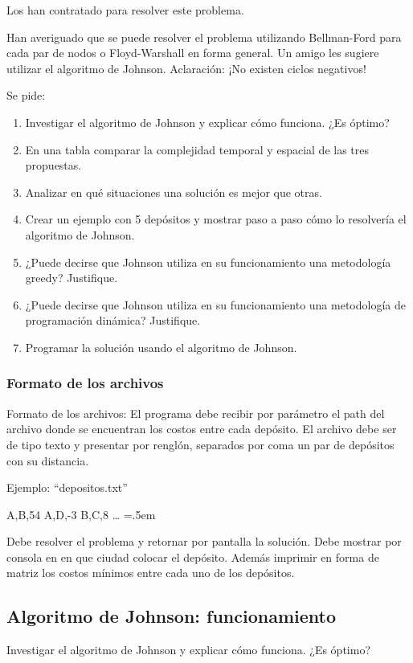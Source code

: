 \documentclass[titlepage,a4paper]{article}
\newenvironment{lcverbatim}
 {\SaveVerbatim{cverb}}
 {\endSaveVerbatim
  \flushleft\fboxrule=0pt\fboxsep=.5em
  \colorbox{cverbbg}{%
    \makebox[\dimexpr\linewidth-2\fboxsep][l]{\BUseVerbatim{cverb}}%
  }
  \endflushleft
}
\begin{document}
Los han contratado para resolver este problema.

Han averiguado que se puede resolver el problema utilizando Bellman-Ford para cada
par de nodos o Floyd-Warshall en forma general. Un amigo les sugiere utilizar el
algoritmo de Johnson. Aclaración: ¡No existen ciclos negativos!

\noindent Se pide:

\begin{enumerate}
    \item Investigar el algoritmo de Johnson y explicar cómo funciona. ¿Es óptimo?
    \item En una tabla comparar la complejidad temporal y espacial de las tres propuestas.
    \item Analizar en qué situaciones una solución es mejor que otras.
    \item Crear un ejemplo con 5 depósitos y mostrar paso a paso cómo lo resolvería el algoritmo de Johnson.
    \item ¿Puede decirse que Johnson utiliza en su funcionamiento una metodología greedy? Justifique.
    \item ¿Puede decirse que Johnson utiliza en su funcionamiento una metodología de programación dinámica? Justifique.
    \item Programar la solución usando el algoritmo de Johnson.
\end{enumerate}

\subsubsection{Formato de los archivos}
Formato de los archivos:
El programa debe recibir por parámetro el path del archivo donde se encuentran los
costos entre cada depósito. El archivo debe ser de tipo texto y presentar por renglón,
separados por coma un par de depósitos con su distancia.

Ejemplo: “depositos.txt”

\begin{lcverbatim}
    A,B,54
    A,D,-3
    B,C,8
    …
\end{lcverbatim}

Debe resolver el problema y retornar por pantalla la solución. Debe mostrar por
consola en en que ciudad colocar el depósito. Además imprimir en forma de matriz los
costos mínimos entre cada uno de los depósitos.


\newpage\subsection{Algoritmo de Johnson: funcionamiento}\label{sec:parte1_1}
\begin{tcolorbox}[colback=blue!5!white,colframe=blue!75!black,title=Enunciado 1.1]
    Investigar el algoritmo de Johnson y explicar cómo funciona. ¿Es óptimo?
\end{tcolorbox}
\end{document}
